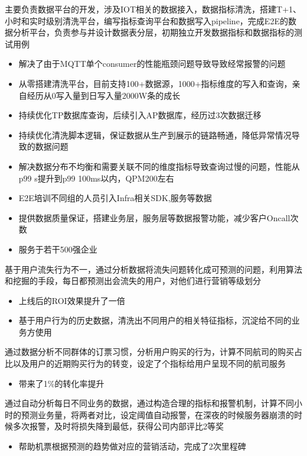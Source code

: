 \documentclass{resume}
\begin{document}
主要负责数据平台的开发，涉及IOT相关的数据接入，数据指标清洗，搭建T+1、小时和实时级别清洗平台，编写指标查询平台和数据写入pipeline，完成E2E的数据分析平台，负责参与并设计数据表分层，初期独立开发数据指标和数据指标的测试用例
\begin{itemize}
  \item 解决了由于MQTT单个consumer的性能瓶颈问题导致导致经常报警的问题
  \item 从零搭建清洗平台，目前支持100+数据源，1000+指标维度的写入和查询，亲自经历从0写入量到日写入量2000W条的成长
  \item 持续优化TP数据库查询，后续引入AP数据库，经历过3次数据迁移
  \item 持续优化清洗脚本逻辑，保证数据从生产到展示的链路畅通，降低异常情况导致的数据问题
  \item 解决数据分布不均衡和需要关联不同的维度指标导致查询过慢的问题，性能从p99 s提升到p99 100ms以内，QPM200左右
  \item E2E培训不同组的人员引入Infra相关SDK,服务等数据
  \item 提供数据质量保证，搭建业务层，服务层等数据报警功能，减少客户Oncall次数
  \item 服务于若干500强企业
\end{itemize}


基于用户流失行为不一，通过分析数据将流失问题转化成可预测的问题，利用算法和挖掘的手段，每日都预测出会流失的用户，对他们进行营销等级划分
\begin{itemize}
  \item 上线后的ROI效果提升了一倍
  \item 基于用户行为的历史数据，清洗出不同用户的相关特征指标，沉淀给不同的业务方使用
\end{itemize}


通过数据分析不同群体的订票习惯，分析用户购买的行为，计算不同航司的购买占比以及用户的近期购买行为的转变，设定了个指标给用户呈现不同的航司服务
\begin{itemize}
  \item 带来了1\%的转化率提升
\end{itemize}


通过自动分析每日不同业务的数据，通过构造合理的指标和报警机制，计算不同小时的预测业务量，将两者对比，设定阈值自动报警，在深夜的时候服务器崩溃的时候多次报警，及时将损失降到最低，获得公司内部评比2等奖
\begin{itemize}
  \item 帮助机票根据预测的趋势做对应的营销活动，完成了2次里程碑
\end{itemize}
\end{document}
